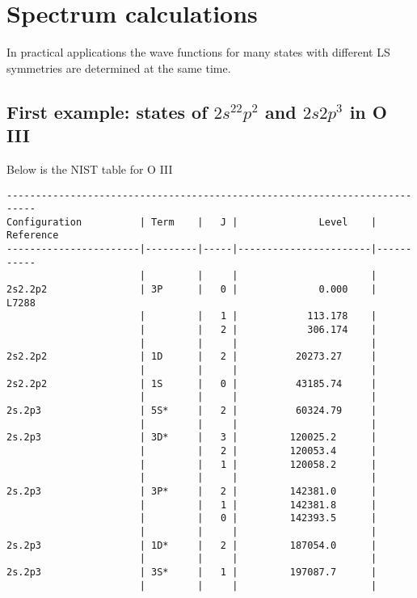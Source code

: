 \documentclass[fleqn,10pt]{book}
\begin{document}
\chapter{Spectrum calculations}
In practical applications the wave functions for many states with different LS symmetries are determined at the same time. 
\section{First example: states of $2s^22p^2$ and $2s2p^ 3$ in O III}
Below is the NIST table for O III

\begin{verbatim}
---------------------------------------------------------------------------
Configuration          | Term    |   J |              Level    | Reference
-----------------------|---------|-----|-----------------------|-----------
                       |         |     |                       |           
2s2.2p2                | 3P      |   0 |              0.000    |     L7288
                       |         |   1 |            113.178    |          
                       |         |   2 |            306.174    |          
                       |         |     |                       |           
2s2.2p2                | 1D      |   2 |          20273.27     |          
                       |         |     |                       |           
2s2.2p2                | 1S      |   0 |          43185.74     |          
                       |         |     |                       |           
2s.2p3                 | 5S*     |   2 |          60324.79     |          
                       |         |     |                       |           
2s.2p3                 | 3D*     |   3 |         120025.2      |          
                       |         |   2 |         120053.4      |          
                       |         |   1 |         120058.2      |          
                       |         |     |                       |           
2s.2p3                 | 3P*     |   2 |         142381.0      |          
                       |         |   1 |         142381.8      |          
                       |         |   0 |         142393.5      |          
                       |         |     |                       |           
2s.2p3                 | 1D*     |   2 |         187054.0      |          
                       |         |     |                       |           
2s.2p3                 | 3S*     |   1 |         197087.7      |          
                       |         |     |                       |           

\end{verbatim}
\end{document}
